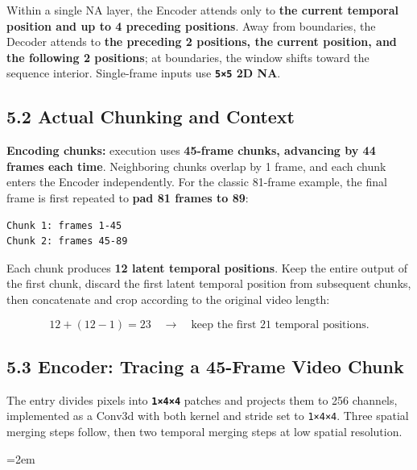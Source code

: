 \documentclass[
  11pt,
  a4paper,
]{article}
\newcommand{\NotesTableStyle}{\linespread{1}\fontsize{9.5pt}{13pt}\selectfont\setlength{\tabcolsep}{4pt}\renewcommand{\arraystretch}{1.1}\setlength{\extrarowheight}{5pt}\setlength{\LTpre}{5pt}\setlength{\LTpost}{6pt}\setlength{\parskip}{0pt}\emergencystretch=2em}
\begin{document}
\endgroup

Within a single NA layer, the Encoder attends only to \textbf{the
current temporal position and up to 4 preceding positions}. Away from
boundaries, the Decoder attends to \textbf{the preceding 2 positions,
the current position, and the following 2 positions}; at boundaries, the
window shifts toward the sequence interior. Single-frame inputs use
\textbf{\texttt{5×5} 2D NA}.


\subsection{5.2 Actual Chunking and Context}\label{flux3-chunking}

\textbf{Encoding chunks:} execution uses \textbf{45-frame chunks,
advancing by 44 frames each time}. Neighboring chunks overlap by 1
frame, and each chunk enters the Encoder independently. For the classic
81-frame example, the final frame is first repeated to \textbf{pad 81
frames to 89}:

\begin{verbatim}
Chunk 1: frames 1-45
Chunk 2: frames 45-89
\end{verbatim}

Each chunk produces \textbf{12 latent temporal positions}. Keep the
entire output of the first chunk, discard the first latent temporal
position from subsequent chunks, then concatenate and crop according to
the original video length:

\[
12+(12-1)=23
\quad\longrightarrow\quad
\text{keep the first }21\text{ temporal positions}.
\]


\subsection{5.3 Encoder: Tracing a 45-Frame Video
Chunk}\label{flux3-encoder}

The entry divides pixels into \textbf{\texttt{1×4×4}} patches and
projects them to 256 channels, implemented as a Conv3d with both kernel
and stride set to \texttt{1×4×4}. Three spatial merging steps follow,
then two temporal merging steps at low spatial resolution.

\begingroup\NotesTableStyle\fontsize{10pt}{12pt}\selectfont\renewcommand{\arraystretch}{1.02}\setlength{\extrarowheight}{1pt}
\end{document}
